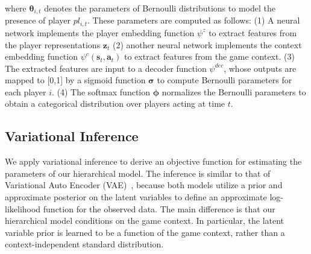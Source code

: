 \documentclass[letterpaper]{article} %
\newcommand{\context}{c}
\newcommand{\latentvariables}{\mathbf{z}}
\newcommand{\generation}{p}
\newcommand{\state}{\mathbf{s}}
\newcommand{\action}{\mathbf{a}}
\newcommand{\player}{pl}
\newcommand{\pindex}{i}
\newcommand{\softmax}{\boldsymbol{\phi}}
\newcommand{\sigmoid}{\boldsymbol{\sigma}}
\newcommand{\GaussianParameters}{\boldsymbol{\omega}}
\newcommand{\BernoulliParameters}{\boldsymbol{\theta}}
\begin{document}
\noindent where $\BernoulliParameters_{\pindex,t}$ denotes the parameters of Bernoulli distributions to model the presence of player $\player_{\pindex,t}$. These parameters are computed as follows: (1) A neural network implements the player embedding function $\psi^{z}$ to extract features from the player representations $\latentvariables_{t}$ (2) another neural network implements the context embedding function $ \psi^{\context}(\state_{t},\action_{t})$ to extract features from the game context. (3) The extracted features are input to a decoder function $\psi^{dec}$, whose outputs are mapped to [0,1] by a sigmoid function $\sigmoid$ to compute Bernoulli parameters for each player $i$. (4) The softmax function $\softmax$ normalizes the Bernoulli parameters %
to obtain a categorical distribution over players acting at time $t$.



\subsection{Variational Inference}


We apply variational inference to derive an objective function for estimating the parameters of our hierarchical model. The inference is similar to that of Variational Auto Encoder (VAE)~\cite{kingma2013auto}, because both models utilize a prior and approximate posterior on the latent variables to define an approximate log-likelihood function for the observed data. 
The main difference is that our hierarchical model conditions on the game context. In particular, the latent variable prior is learned to be a function of the game context, rather than a context-independent standard distribution.
\end{document}
